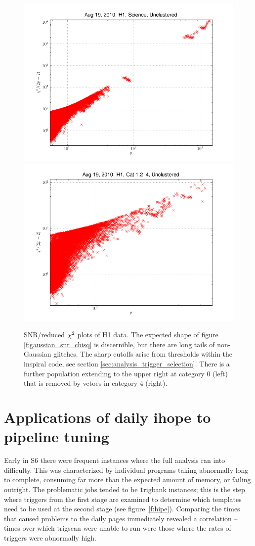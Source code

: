 \begin{figure}
  \includegraphics[width=0.5\linewidth]{figures/detchar/H1_0_UNCLUSTERED_chisq.png}
  \includegraphics[width=0.5\linewidth]{figures/detchar/H1_4_UNCLUSTERED_chisq.png}
  \caption[SNR/reduced $\chisq$ plots of H1 data.]{
  \label{f:daily_ihope_snr_chisq}
SNR/reduced $\chisq$ plots of H1 data.  The expected shape
of figure \ref{f:gaussian_snr_chisq} is discernible, but there are
long tails of non-Gaussian glitches.  The sharp cutoffs arise 
from thresholds within the inspiral code, see section
\ref{sec:analysis_trigger_selection}.  There is a further
population extending to the upper right at category 0 (left) that is
removed by vetoes in category 4 (right).}
\end{figure}%


\section{Applications of daily ihope to pipeline tuning}

Early in S6 there were frequent instances where the full analysis ran
into difficulty.  This was characterized by individual programs taking
abnormally long to complete, consuming far more than the expected
amount of memory, or failing outright.  The problematic jobs tended to
be {\texttt trigbank} instances; this is the step where triggers from
the first stage are examined to determine which templates need to be
used at the second stage (see figure~\ref{f:hipe}).  Comparing the
times that caused problems to the daily pages immediately revealed a
correlation -- times over which trigscan were unable to run were those
where the rates of triggers were abnormally high.

